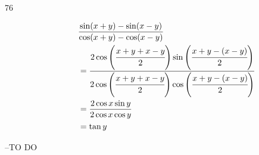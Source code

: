 \documentclass{exam}
\begin{document}
\begin{description}
      \item[76]
        \begin{align*}
          & \frac{\sin (x + y) - \sin (x - y)}{\cos (x + y) - \cos (x - y)} \\
            & = \frac{2 \cos \left( \cfrac{x + y + x - y}{2} \right) \sin \left( \cfrac{x + y - (x - y)}{2} \right)}
                     {2 \cos \left( \cfrac{x + y + x - y}{2} \right) \cos \left( \cfrac{x + y - (x - y)}{2} \right)} \\
            & = \frac{2 \cos x \sin y}{2 \cos x \cos y} \\
            & = \tan y \\
        \end{align*}

    \end{description}

  \else
    \vspace{5 cm}

    \begin{quote}
      \begin{em}
      \end{em}
    \end{quote}
    \hspace{1 cm} --TO DO
  \fi
\end{document}
